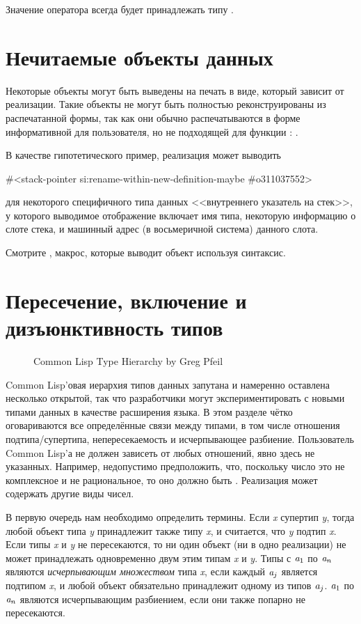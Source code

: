 Значение оператора  всегда будет принадлежать типу .

\section{Нечитаемые объекты данных}

Некоторые объекты могут быть выведены на печать в виде, который зависит от
реализации.
Такие объекты не могут быть полностью реконструированы из распечатанной формы,
так как они обычно распечатываются в форме информативной для пользователя, но не
подходящей для функции :
.

В качестве гипотетического пример, реализация может выводить 
\begin{lisp}
\#<stack-pointer si:rename-within-new-definition-maybe \#o311037552>
\end{lisp}
для некоторого специфичного типа данных <<внутреннего указатель на стек>>, у
которого выводимое отображение включает имя типа, некоторую информацию о слоте
стека, и машинный адрес (в восьмеричной система) данного слота.

Смотрите , макрос, которые выводит объект используя
\cd{\#<} синтаксис.

\section{Пересечение, включение и дизъюнктивность типов}
\label{DATA-TYPE-RELATIONSHIPS}

\begin{figure}
\caption{Common Lisp Type Hierarchy by Greg Pfeil}
\label{TYPES-HEIRARCHY-GRAPHIC}
\small\noindent
\end{figure}


Common Lisp'овая иерархия типов данных запутана и намеренно оставлена несколько
открытой, так что разработчики могут экспериментировать с новыми типами данных в
качестве расширения языка. В этом разделе чётко оговариваются все
определённые связи между типами, в том числе отношения подтипа/супертипа,
непересекаемость и исчерпывающее разбиение. Пользователь Common Lisp'а
не должен зависеть от любых отношений, явно здесь не указанных.
Например, недопустимо предположить, что, поскольку число
это не комплексное и не рациональное, то оно должно быть . Реализация
может содержать другие виды чисел.

В первую очередь нам необходимо определить термины.
Если \emph{x} супертип \emph{y}, тогда любой объект типа \emph{y} принадлежит
также типу \emph{x}, и считается, что \emph{y} подтип \emph{x}. Если типы
\emph{x} и \emph{y} не пересекаются, то ни один объект (ни в одно реализации) не
может принадлежать одновременно двум этим типам \emph{x} и \emph{y}. Типы
с $\emph{a}_1$ по $\emph{a}_{n}$ являются \emph{исчерпывающим множеством} типа
\emph{x}, если каждый $\emph{a}_j$ является подтипом \emph{x}, и любой объект
обязательно принадлежит одному из типов $\emph{a}_{j}$.
$\emph{a}_1$ по $\emph{a}_{n}$ являются исчерпывающим разбиением, если они также
попарно не пересекаются.

